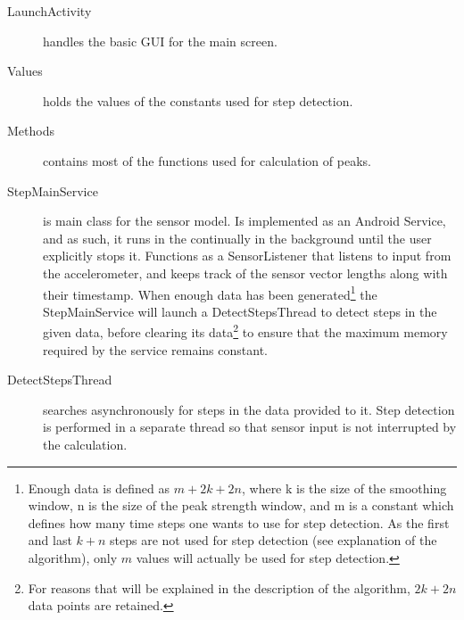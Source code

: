 \begin{description}

\item[LaunchActivity]
handles the basic GUI for the main screen.

\item[Values]
holds the values of the constants used for step detection.

\item[Methods]
contains most of the functions used for calculation of peaks.

\item[StepMainService]
is main class for the sensor model. Is implemented as an Android Service, and as such, it runs in the continually in the background until the user explicitly stops it. Functions as a SensorListener that listens to input from the accelerometer, and keeps track of the sensor vector lengths along with their timestamp. When enough data has been generated\footnote{Enough data is defined as $m+2k+2n$, where k is the size of the smoothing window, n is the size of the peak strength window, and m is a constant which defines how many time steps one wants to use for step detection. As the first and last $k+n$ steps are not used for step detection (see explanation of the algorithm), only $m$ values will actually be used for step detection.} the StepMainService will launch a DetectStepsThread to detect steps in the given data, before clearing its data\footnote{For reasons that will be explained in the description of the algorithm, $2k+2n$ data points are retained.} to ensure that the maximum memory required by the service remains constant. 

\item[DetectStepsThread]
searches asynchronously for steps in the data provided to it. Step detection is performed in a separate thread so that sensor input is not interrupted by the calculation.


\end{description}
